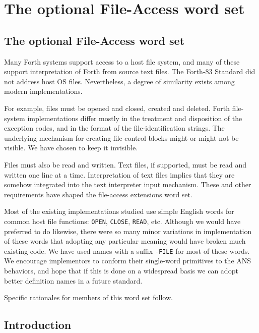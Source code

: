 \chapter{The optional File-Access word set} %

\begin{intro}
\section{The optional File-Access word set}

Many Forth systems support access to a host file system, and many of
these support interpretation of Forth from source text files. The
Forth-83 Standard did not address host OS files. Nevertheless, a degree
of similarity exists among modern implementations.

For example, files must be opened and closed, created and deleted.
Forth file-system implementations differ mostly in the treatment and
disposition of the exception codes, and in the format of the
file-identification strings. The underlying mechanism for creating
file-control blocks might or might not be visible. We have chosen to
keep it invisible.

Files must also be read and written. Text files, if supported, must
be read and written one line at a time. Interpretation of text files
implies that they are somehow integrated into the text interpreter
input mechanism. These and other requirements have shaped the
file-access extensions word set.

Most of the existing implementations studied use simple English words
for common host file functions: \texttt{OPEN}, \texttt{CLOSE},
\texttt{READ}, etc. Although we would have preferred to do likewise,
there were so many minor variations in implementation of these words
that adopting any particular meaning would have broken much existing
code. We have used names with a suffix \texttt{-FILE} for most of these
words. We encourage implementors to conform their single-word primitives
to the ANS behaviors, and hope that if this is done on a widespread
basis we can adopt better definition names in a future standard.

Specific rationales for members of this word set follow.
\end{intro}

\section{Introduction} %

